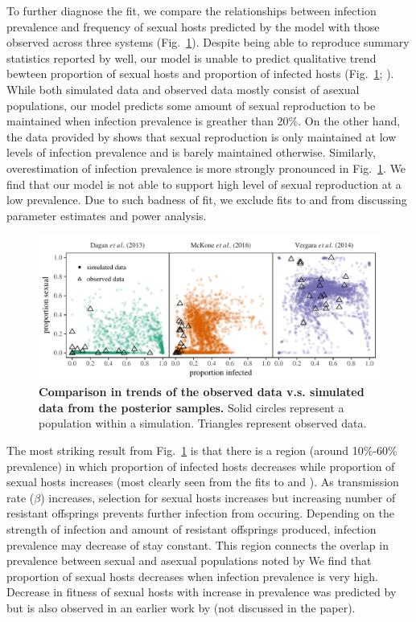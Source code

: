 \documentclass{article}\usepackage[]{graphicx}\usepackage[]{color}
\newcommand{\fref}[1]{Fig.~\ref{fig:#1}}
\begin{document}
To further diagnose the fit, we compare the relationships between infection prevalence and frequency of sexual hosts predicted by the model with those observed across three systems (\fref{ivs}).
Despite being able to reproduce summary statistics reported by \cite{dagan2013clonal} well, 
our model is unable to predict qualitative trend bewteen proportion of sexual hosts and proportion of infected hosts (\fref{ivs}; \cite{dagan2013clonal}).
While both simulated data and observed data mostly consist of asexual populations,
our model predicts some amount of sexual reproduction to be maintained when infection prevalence is greather than 20\%. 
On the other hand, the data provided by \cite{dagan2013clonal} shows that sexual reproduction is only maintained at low levels of infection prevalence and is barely maintained otherwise.
Similarly, overestimation of infection prevalence is more strongly pronounced in \fref{ivs}.
We find that our model is not able to support high level of sexual reproduction at a low prevalence.
Due to such badness of fit, we exclude fits to \cite{dagan2013clonal} and \cite{mckone2016fine} from discussing parameter estimates and power analysis.

\begin{figure}[!htp]
\includegraphics[width=\textwidth]{../fig/simulated_data.pdf}
\caption{{\bf Comparison in trends of the observed data v.s. simulated data from the posterior samples.}
Solid circles represent a population within a simulation. Triangles represent observed data.}
\label{fig:ivs}
\end{figure}

The most striking result from \fref{ivs} is that there is a region (around 10\%-60\% prevalence) in which proportion of infected hosts decreases while proportion of sexual hosts increases (most clearly seen from the fits to \cite{mckone2016fine} and \cite{vergara2014infection}).
As transmission rate ($\beta$) increases, selection for sexual hosts increases but increasing number of resistant offsprings prevents further infection from occuring. 
Depending on the strength of infection and amount of resistant offsprings produced, infection prevalence may decrease of stay constant.
This region connects the overlap in prevalence between sexual and asexual populations noted by \cite{lively2001trematode}
We find that proportion of sexual hosts decreases when infection prevalence is very high.
Decrease in fitness of sexual hosts with increase in prevalence was predicted by \cite{ashby2015diversity} but is also observed in an earlier work by \cite{lively2010epidemiological} (not discussed in the paper).
\end{document}
